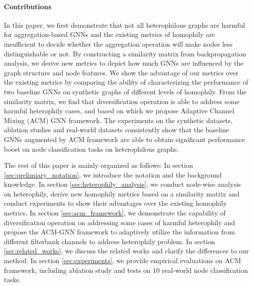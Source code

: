 \documentclass{article}
\newcommand{\0}{{\boldsymbol{0}}}
\newcommand{\6}{{\partial}}
\newcommand{\8}{{\infty}}
\newcommand{\4}{{\nabla}}
\begin{document}
\paragraph{Contributions} In this paper, we first demonstrate that not all heterophilous graphs are harmful for aggregation-based GNNs and the existing metrics of homophily are insufficient to decide whether the aggregation operation will make nodes less distinguishable or not. By constructing a similarity matrix from backpropagation analysis, we derive new metrics to depict how much GNNs are influenced by the graph structure and node features. We show the advantage of our metrics over the existing metrics by comparing the ability of characterizing the performance of two baseline GNNs on synthetic graphs of different levels of homophily. From the similarity matrix, we find that diversification operation is able to address some harmful heterophily cases, and based on which we propose Adaptive Channel Mixing (ACM) GNN framework. The experiments on the synthetic datasets, ablation studies and real-world datasets consistently show that the baseline GNNs augmented by ACM framework are able to obtain significant performance boost on node classification tasks on heterophilous graphs.



The rest of this paper is mainly organized as follows: In section \ref{sec:prelimiary_notation}, we introduce the notation and the background knowledge. In section \ref{sec:heterophily_analysis}, we conduct node-wise analysis on heterophily, derive new homophily metrics based on a similarity matrix and conduct experiments to show their advantages over the existing homophily metrics. In section \ref{sec:acm_framework}, we demonstrate the capability of diversification operation on addressing some cases of harmful heterophily and propose the ACM-GNN framework to adaptively utilize the information from different filterbank channels to address heterophily problem. In section \ref{sec:related_works}, we discuss the related works and clarify the differences to our method. In section \ref{sec:experiments}, we provide empirical evaluations on ACM framework, including ablation study and tests on $10$ real-world node classification tasks.
\end{document}
